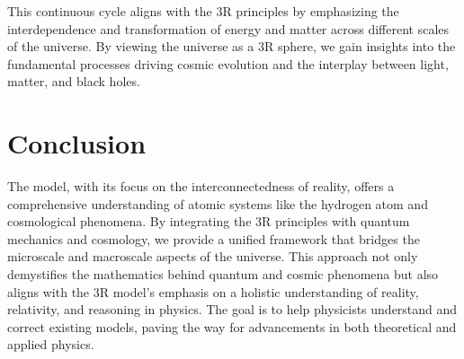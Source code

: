 \documentclass[12pt]{article}
\begin{document}
This continuous cycle aligns with the 3R principles by emphasizing the interdependence and transformation of energy and matter across different scales of the universe. By viewing the universe as a 3R sphere, we gain insights into the fundamental processes driving cosmic evolution and the interplay between light, matter, and black holes.

\section{Conclusion}

The \iR model, with its focus on the interconnectedness of reality, offers a comprehensive understanding of atomic systems like the hydrogen atom and cosmological phenomena. By integrating the 3R principles with quantum mechanics and cosmology, we provide a unified framework that bridges the microscale and macroscale aspects of the universe. This approach not only demystifies the mathematics behind quantum and cosmic phenomena but also aligns with the 3R model's emphasis on a holistic understanding of reality, relativity, and reasoning in physics. The goal is to help physicists understand and correct existing models, paving the way for advancements in both theoretical and applied physics.
\end{document}

